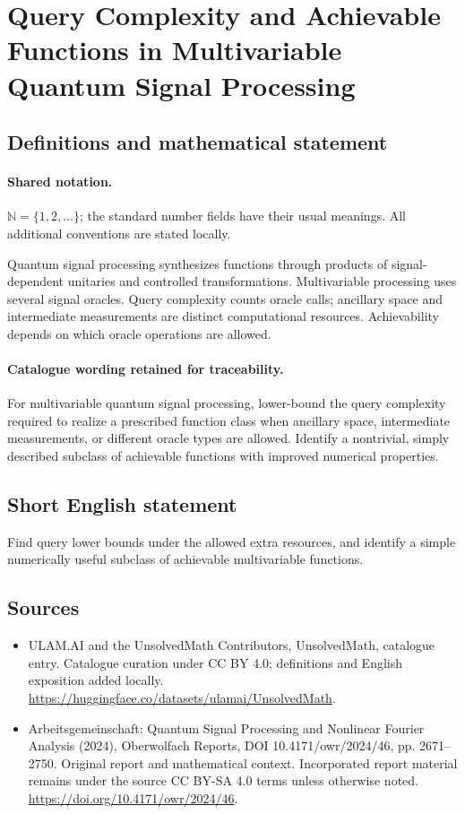 \documentclass[11pt]{article}
\begin{document}
\section{Query Complexity and Achievable Functions in Multivariable Quantum Signal Processing}\label{statement}

\subsection{Definitions and mathematical statement}

\paragraph{Shared notation.}$\mathbb N=\{1,2,\ldots\}$; the standard number fields have their usual meanings. All additional conventions are stated locally.


Quantum signal processing synthesizes functions through products of signal-dependent unitaries and controlled transformations. Multivariable processing uses several signal oracles. Query complexity counts oracle calls; ancillary space and intermediate measurements are distinct computational resources. Achievability depends on which oracle operations are allowed.

\paragraph{Catalogue wording retained for traceability.}
For multivariable quantum signal processing, lower-bound the query complexity required to realize a prescribed function class when ancillary space, intermediate measurements, or different oracle types are allowed. Identify a nontrivial, simply described subclass of achievable functions with improved numerical properties.
\subsection{Short English statement}
Find query lower bounds under the allowed extra resources, and identify a simple numerically useful subclass of achievable multivariable functions.
\subsection{Sources}
\begin{itemize}
\item[\hypertarget{source:statement:1}{S1}] ULAM.AI and the UnsolvedMath Contributors, UnsolvedMath, catalogue entry. Catalogue curation under CC BY 4.0; definitions and English exposition added locally.
\url{https://huggingface.co/datasets/ulamai/UnsolvedMath}.
\item[\hypertarget{source:statement:2}{S2}] Arbeitsgemeinschaft: Quantum Signal Processing and Nonlinear Fourier Analysis (2024), Oberwolfach Reports, DOI 10.4171/owr/2024/46, pp. 2671--2750. Original report and mathematical context. Incorporated report material remains under the source CC BY-SA 4.0 terms unless otherwise noted.
\url{https://doi.org/10.4171/owr/2024/46}.
\end{itemize}
\label{end:statement}
\end{document}
